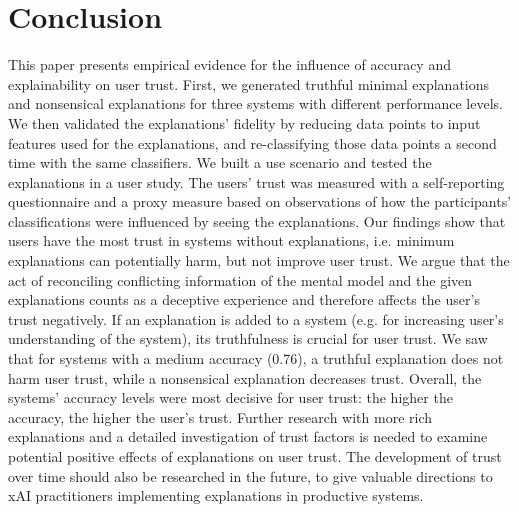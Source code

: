 \section{Conclusion}
This paper presents empirical evidence for the influence of accuracy and explainability on user trust. First, we generated truthful minimal explanations and nonsensical explanations for three systems with different performance levels. We then validated the explanations' fidelity by reducing data points to input features used for the explanations, and re-classifying those data points a second time with the same classifiers. We built a use scenario and tested the explanations in a user study. The users' trust was measured with a self-reporting questionnaire and a proxy measure based on observations of how the participants' classifications were influenced by seeing the explanations.\newline
Our findings show that users have the most trust in systems without explanations, i.e. minimum explanations can potentially harm, but not improve user trust. We argue that the act of reconciling conflicting information of the mental model and the given explanations counts as a deceptive experience and therefore affects the user's trust negatively. If an explanation is added to a system (e.g. for increasing user's understanding of the system), its truthfulness is crucial for user trust. We saw that for systems with a medium accuracy (0.76), a truthful explanation does not harm user trust, while a nonsensical explanation decreases trust. Overall, the systems' accuracy levels were most decisive for user trust: the higher the accuracy, the higher the user's trust.\newline
Further research with more rich explanations and a detailed investigation of trust factors is needed to examine potential positive effects of explanations on user trust. The development of trust over time should also be researched in the future, to give valuable directions to xAI practitioners implementing explanations in productive systems.